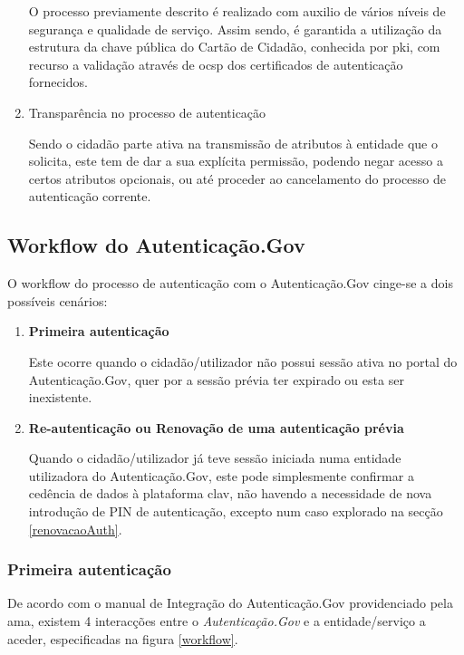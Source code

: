 \begin{enumerate}
    O processo previamente descrito é realizado com auxilio de vários níveis de segurança e qualidade de serviço. Assim sendo, é garantida a utilização da estrutura da chave pública do Cartão de Cidadão, conhecida por \gls{pki}, com recurso a validação através de \gls{ocsp} dos certificados de autenticação fornecidos.
    
    \item Transparência no processo de autenticação
    
    Sendo o cidadão parte ativa na transmissão de atributos à entidade que o solicita, este tem de dar a sua explícita permissão, podendo negar acesso a certos atributos opcionais, ou até proceder ao cancelamento do processo de autenticação corrente.
\end{enumerate}

\cleardoublepage
\subsection{Workflow do Autenticação.Gov}

O workflow do processo de autenticação com o Autenticação.Gov cinge-se a dois possíveis cenários:

\begin{enumerate}
    \item \textbf{Primeira autenticação}
    
    Este ocorre quando o cidadão/utilizador não possui sessão ativa no portal do Autenticação.Gov, quer por a sessão prévia ter expirado ou esta ser inexistente.
    
    \item \textbf{Re-autenticação ou Renovação de uma autenticação prévia}
    
    Quando o cidadão/utilizador já teve sessão iniciada numa entidade utilizadora do Autenticação.Gov, este pode simplesmente confirmar a cedência de dados à plataforma \gls{clav}, não havendo a necessidade de nova introdução de PIN de autenticação, excepto num caso explorado na secção \ref{renovacaoAuth}.
\end{enumerate}

\subsubsection{Primeira autenticação}
De acordo com o manual de Integração do Autenticação.Gov\cite{manualAuthGov} providenciado pela \gls{ama}, existem 4 interacções entre o \emph{Autenticação.Gov} e a entidade/serviço a aceder, especificadas na figura \ref{workflow}.

